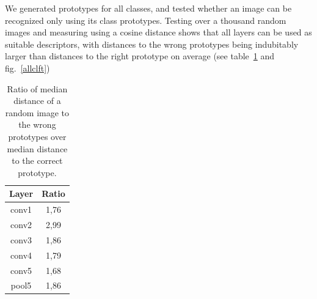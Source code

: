 We generated prototypes for all classes, and tested whether an image can be recognized only using its class prototypes. Testing over a thousand random images and measuring using a cosine distance shows that all layers can be used as suitable descriptors, with distances to the wrong prototypes being indubitably larger than distances to the right prototype on average (see table~\ref{fulltrainvalues} and fig.~\ref{allclft})

\begin{table}[htb]
\centering
\begin{tabular}{|c|c|}
  \hline
   Layer & Ratio \\
  \hline
  conv1 & 1,76\\ %
  conv2 & 2,99\\ %
  conv3 & 1,86\\ %
  conv4 & 1,79\\ %
  conv5 & 1,68\\ %
  pool5 & 1,86\\ %
  \hline
\end{tabular}
\caption{Ratio of median distance of a random image to the wrong prototypes over median distance to the correct prototype.}
\label{fulltrainvalues}
\end{table}

